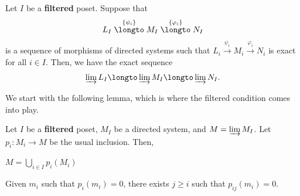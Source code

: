 \begin{theorem}
    \label{thm:direct_lim_is_exact}
    Let $I$ be a \textbf{filtered} poset.
    Suppose that 
    $$L_I \stackrel{\{\psi_i\}}\longto
    M_I \stackrel{\{\varphi_i\}}\longto N_I$$
    is a sequence of morphisms of directed systems
    such that
    $L_i \stackrel{\psi_i}\to M_i
    \stackrel{\varphi_i}\to N_i$
    is exact for all $i\in I$.
    Then, we have the exact sequence
    $$\varinjlim L_I \longto \varinjlim M_I
    \longto \varinjlim N_I.$$
\end{theorem}
We start with the following lemma,
which is where the filtered condition comes into play.
\begin{lemma}
    \label{lem:direct_limit_exact}
    Let $I$ be a \textbf{filtered} poset,
    $M_I$ be a directed system,
    and $M = \varinjlim M_I$.
    Let $p_i : M_i\to M$ be the usual inclusion.
    Then,
    \begin{alphenum}
    \item $M = \bigcup_{i\in I} p_i(M_i)$
    \item Given $m_i$ such that $p_i(m_i) = 0$,
	there exists $j\geq i$ such that $p_{ij}(m_i)=0$.
    \end{alphenum}
\end{lemma}
